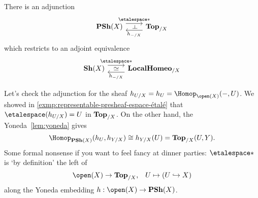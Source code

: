 \documentclass[../main.tex]{subfiles}
\begin{document}
\begin{thm}\label{thm:sheaf-space-adjunction}
There is an adjunction
\begin{equation*}
  \begin{tikzcd}
    \catPresheaf(X) \ar[r, "{\etalespace*}"{name=leftadj}, shift left=2] & \catTopologicalSpace_{/X} \ar[l, "h_{-/X}"{name=rightadj}, shift left=2]
    \ar[from=leftadj, to=rightadj, phantom, "\leftadj" marking]
  \end{tikzcd}
\end{equation*}
which restricts to an adjoint equivalence
\begin{equation*}
  \begin{tikzcd}
    \catSheaf(X) \ar[r, "{\etalespace*}"{name=leftadj}, shift left=2] & \catLocalHomeomorphism_{/X} \ar[l, "h_{-/X}"{name=rightadj}, shift left=2]
    \ar[from=leftadj, to=rightadj, phantom, "\simeq"]
  \end{tikzcd}
\end{equation*}
\end{thm}

\begin{exmp}
Let's check the adjunction for the sheaf $h_{U/X} = h_U = \Hom[\open(X)](-,U)$.
We showed in \cref{exmp:representable-presheaf-espace-étalé} that $\etalespace(h_{U/X}) = U$ in $\mathbf{Top}_{/X}$.
On the other hand, the Yoneda~\cref{lem:yoneda} gives
\[ \Hom[\catPresheaf(X)](h_U,h_{Y/X}) \cong h_{Y/X}(U) = \cont[X](U,Y)\text{.} \]
Some formal nonsense if you want to feel fancy at dinner parties: $\etalespace*$ is `by definition' the left  of
\[ \open(X)\to\catTopologicalSpace_{/X}\text{,} \quad U \mapsto (U\hookrightarrow X) \]
along the Yoneda embedding $h\colon\open(X)\to\catPresheaf(X)$.
\end{exmp}
\end{document}
